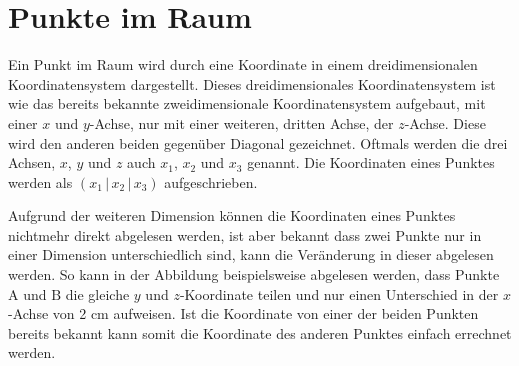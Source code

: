 \documentclass{article}
\begin{document}
   
\newcommand{\norm}[1]{\big| {#1} \big|}  
\newcommand{\vect}[1]{\overrightarrow{#1}} 
 
\section{Punkte im Raum}
\begin{minipage}{\dimexpr\linewidth-5cm}
 Ein Punkt im Raum wird durch eine Koordinate in einem dreidimensionalen Koordinatensystem dargestellt. Dieses dreidimensionales Koordinatensystem ist wie das bereits bekannte zweidimensionale Koordinatensystem aufgebaut, mit einer $x$ und $y$-Achse, nur mit einer weiteren, dritten Achse, der $z$-Achse. Diese wird den anderen beiden gegenüber Diagonal gezeichnet. Oftmals werden die drei Achsen, $x$, $y$ und $z$ auch $x_1$, $x_2$ und $x_3$ genannt. Die Koordinaten eines Punktes werden als ${(x_1 \,\vert\, x_2 \,\vert\, x_3)}$ aufgeschrieben.
\end{minipage}
\hfill
\begin{minipage}{5cm}
 \center 
\end{minipage}
 
\noindent \begin{minipage}{5cm}
 \center 
\end{minipage}
\hfill
\begin{minipage}{\dimexpr\linewidth-5cm}
 Aufgrund der weiteren Dimension können die Koordinaten eines Punktes nichtmehr direkt abgelesen werden, ist aber bekannt dass zwei Punkte nur in einer Dimension unterschiedlich sind, kann die Veränderung in dieser abgelesen werden. So kann in der Abbildung beispielsweise abgelesen werden, dass Punkte $\mathrm{A}$ und $\mathrm{B}$ die gleiche $y$ und $z$-Koordinate teilen und nur einen Unterschied in der $x$-Achse von 2 cm aufweisen. Ist die Koordinate von einer der beiden Punkten bereits bekannt kann somit die Koordinate des anderen Punktes einfach errechnet werden.
\end{minipage}   
\end{document}
